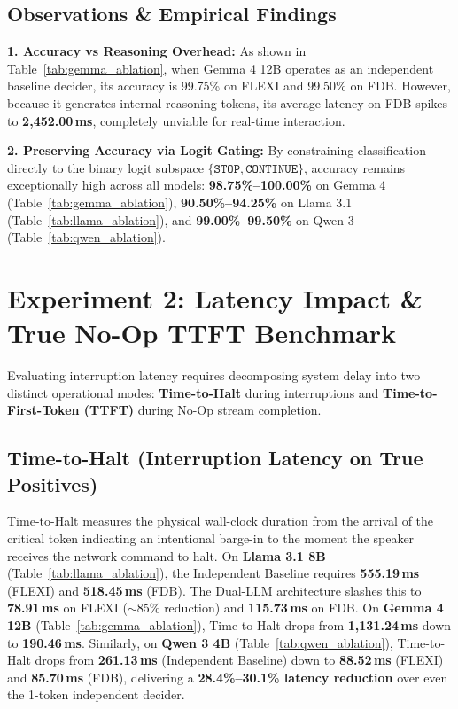 \documentclass{article}
\begin{document}
\subsection{Observations \& Empirical Findings}

\textbf{1. Accuracy vs Reasoning Overhead:}
As shown in Table~\ref{tab:gemma_ablation}, when Gemma 4 12B operates as an independent baseline decider, its accuracy is 99.75\% on FLEXI and 99.50\% on FDB. However, because it generates internal reasoning tokens, its average latency on FDB spikes to \textbf{2,452.00\,ms}, completely unviable for real-time interaction.

\textbf{2. Preserving Accuracy via Logit Gating:}
By constraining classification directly to the binary logit subspace $\{\texttt{STOP}, \texttt{CONTINUE}\}$, accuracy remains exceptionally high across all models: \textbf{98.75\%--100.00\%} on Gemma 4 (Table~\ref{tab:gemma_ablation}), \textbf{90.50\%--94.25\%} on Llama 3.1 (Table~\ref{tab:llama_ablation}), and \textbf{99.00\%--99.50\%} on Qwen 3 (Table~\ref{tab:qwen_ablation}).

\section{Experiment 2: Latency Impact \& True No-Op TTFT Benchmark}

Evaluating interruption latency requires decomposing system delay into two distinct operational modes: \textbf{Time-to-Halt} during interruptions and \textbf{Time-to-First-Token (TTFT)} during No-Op stream completion.

\subsection{Time-to-Halt (Interruption Latency on True Positives)}
Time-to-Halt measures the physical wall-clock duration from the arrival of the critical token indicating an intentional barge-in to the moment the speaker receives the network command to halt. 
On \textbf{Llama 3.1 8B} (Table~\ref{tab:llama_ablation}), the Independent Baseline requires \textbf{555.19\,ms} (FLEXI) and \textbf{518.45\,ms} (FDB). The Dual-LLM architecture slashes this to \textbf{78.91\,ms} on FLEXI ($\sim$85\% reduction) and \textbf{115.73\,ms} on FDB. On \textbf{Gemma 4 12B} (Table~\ref{tab:gemma_ablation}), Time-to-Halt drops from \textbf{1,131.24\,ms} down to \textbf{190.46\,ms}. Similarly, on \textbf{Qwen 3 4B} (Table~\ref{tab:qwen_ablation}), Time-to-Halt drops from \textbf{261.13\,ms} (Independent Baseline) down to \textbf{88.52\,ms} (FLEXI) and \textbf{85.70\,ms} (FDB), delivering a \textbf{28.4\%--30.1\% latency reduction} over even the 1-token independent decider.
\end{document}

